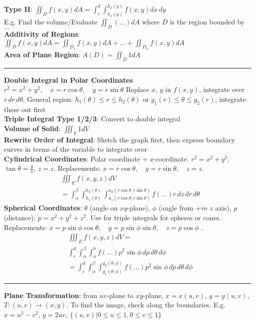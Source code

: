 \documentclass{article}
\begin{document}
{\begin{multicols*}{3}
\textbf{Type II}: $\iint_Df(x,y)dA=\int_c^d\int_{h_1(y)}^{h_2(y)}f(x,y)dx\,dy$ \\
E.g. Find the volume/Evaluate $\iint_D(\dots)dA$ where $D$ is the region bounded by $\dots$\\
\textbf{Additivity of Regions}: $\iint_Df(x,y)dA=\iint_{D_1}f(x,y)dA+\dots+\iint_{D_n}f(x,y)dA$ \\
\textbf{Area of Plane Region}: $A(D)=\iint_D1dA$ \\   
\rule{193pt}{0.2pt}
\textbf{Double Integral in Polar Coordinates}
$r^2=x^2+y^2,\quad x=r\cos\theta,\quad y=r\sin\theta$
Replace $x$, $y$ in $f(x,y)$, integrate over $r\,dr\,d\theta$. General region: $h_1(\theta)\leq r\leq h_2(\theta)$ or $g_1(r)\leq\theta\leq g_2(r)$, integrate these out first\\
\textbf{Triple Integral Type 1/2/3}: Convert to double integral\\
\textbf{Volume of Solid}: $\iiint_V1dV$\\
\textbf{Rewrite Order of Integral}: Sketch the graph first, then express boundary curves in terms of the variable to integrate over\\
\textbf{Cylindrical Coordinates}: Polar coordinate + z-coordinate. $r^2=x^2+y^2$, $\tan\theta=\frac{y}{x}$, $z=z$.  Replacements: $x=r\cos\theta,\quad y=r\sin\theta,\quad z=z$.
\begin{align*}
&\iiint_Ef(x,y,z)dV\\
&=\int_\alpha^\beta\int_{h_1(\theta)}^{h_2(\theta)}\int_{u_1(r\cos\theta,r\sin\theta)}^{u_2(r\cos\theta,r\sin\theta)}f(...)r\,dz\,dr\,d\theta
\end{align*}
\textbf{Spherical Coordinates}: $\theta$ (angle on $xy$-plane), $\phi$ (angle from +ve $z$ axis), $p$ (distance). $p=x^2+y^2+z^2$. Use for triple integrals for spheres or cones. Replacements: $x=p\sin\phi\cos\theta,\quad y=p\sin\phi\sin\theta,\quad z=p\cos\phi$ . 
\begin{align*}
    &\iiint_E f(x,y,z)dV=\\
    &\int_c^d \int_\alpha^\beta \int_a^b f(...)p^2\sin\phi\,dp\,d\theta\,d\phi\\
    &=\int_c^d \int_\alpha^\beta \int_{g_1(\theta,\phi)}^{g_2(\theta,\phi)} f(...)p^2\sin\phi\,dp\,d\theta\,d\phi
\end{align*}
\rule{193pt}{0.2pt}
\textbf{Plane Transformation}: from $uv$-plane to $xy$-plane, $x=x(u,v)$, $y=y(u,v)$, $T:(u,v)\to(x,y)$. To find the image, check along the boundaries. E.g. $x=u^2-v^2$, $y=2uv$, $\{(u,v)|0\leq u\leq1,0\leq v\leq 1\}$ \\

\end{multicols*}}
\end{document}
